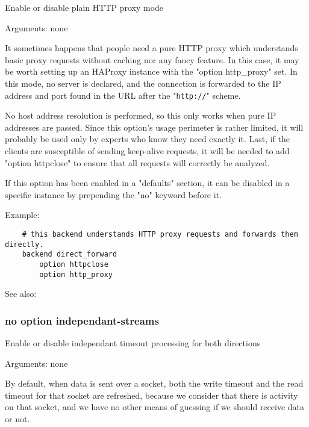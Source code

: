   Enable or disable plain HTTP proxy mode

                                 
  Arguments: none

  It sometimes happens that people need a pure HTTP proxy which understands
  basic proxy requests without caching nor any fancy feature. In this case,
  it may be worth setting up an HAProxy instance with the "option http\_proxy"
  set. In this mode, no server is declared, and the connection is forwarded to
  the IP address and port found in the URL after the "\verb|http://|" scheme.

  No host address resolution is performed, so this only works when pure IP
  addresses are passed. Since this option's usage perimeter is rather limited,
  it will probably be used only by experts who know they need exactly it. Last,
  if the clients are susceptible of sending keep-alive requests, it will be
  needed to add "option httpclose" to ensure that all requests will correctly
  be analyzed.

  If this option has been enabled in a "defaults" section, it can be disabled
  in a specific instance by prepending the "no" keyword before it.

  Example:
\begin{verbatim}
    # this backend understands HTTP proxy requests and forwards them directly.
    backend direct_forward
        option httpclose
        option http_proxy
\end{verbatim}


See also: 

\subsubsection[independant-streams]{}
\subsubsection*{no option independant-streams}


  Enable or disable independant timeout processing for both directions


  Arguments: none

  By default, when data is sent over a socket, both the write timeout and the
  read timeout for that socket are refreshed, because we consider that there is
  activity on that socket, and we have no other means of guessing if we should
  receive data or not.

